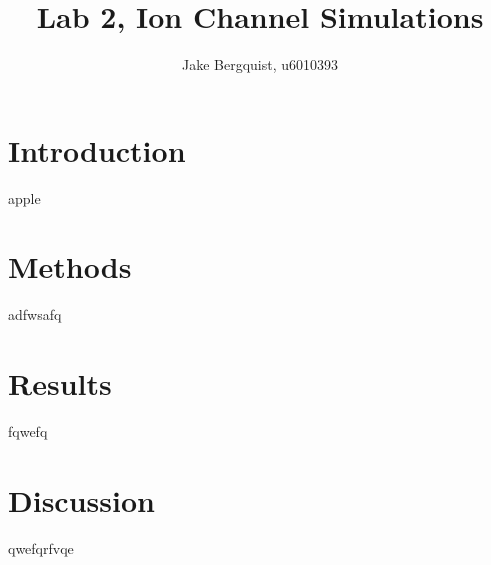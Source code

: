 \documentclass[11pt]{article}
\begin{document}
\title{Lab 2, Ion Channel Simulations}
\author{Jake Bergquist, u6010393}
\maketitle
\tableofcontents
\newpage

\section{Introduction}
 apple~\cite{Knuuti2018a}

\section{Methods}
adfwsafq
\section{Results}

fqwefq
\section{Discussion} 

qwefqrfvqe

{}

\end{document}
